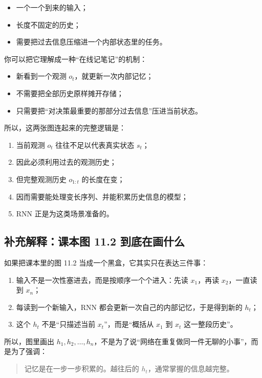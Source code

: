 \documentclass[12pt,a4paper]{ctexart}
\begin{document}
\begin{itemize}
  \item 一个一个到来的输入；
  \item 长度不固定的历史；
  \item 需要把过去信息压缩进一个内部状态里的任务。
\end{itemize}

你可以把它理解成一种“在线记笔记”的机制：
\begin{itemize}
  \item 新看到一个观测 \(o_t\)，就更新一次内部记忆；
  \item 不需要把全部历史原样摊开存储；
  \item 只需要把“对决策最重要的那部分过去信息”压进当前状态。
\end{itemize}

所以，这两张图连起来的完整逻辑是：
\begin{enumerate}
  \item 当前观测 \(o_t\) 往往不足以代表真实状态 \(s_t\)；
  \item 因此必须利用过去的观测历史；
  \item 但完整观测历史 \(o_{1:t}\) 的长度在变；
  \item 因而需要能处理变长序列、并能积累历史信息的模型；
  \item RNN 正是为这类场景准备的。
\end{enumerate}

\subsection{补充解释：课本图 11.2 到底在画什么}

如果把课本里的图 11.2 当成一个黑盒，它其实只在表达三件事：
\begin{enumerate}
  \item 输入不是一次性塞进去，而是按顺序一个个进入：先读 \(x_1\)，再读 \(x_2\)，一直读到 \(x_n\)；
  \item 每读到一个新输入，RNN 都会更新一次自己的内部记忆，于是得到新的 \(h_t\)；
  \item 这个 \(h_t\) 不是“只描述当前 \(x_t\)”，而是“概括从 \(x_1\) 到 \(x_t\) 这一整段历史”。
\end{enumerate}

所以，图里画出 \(h_1,h_2,\ldots,h_n\)，不是为了说“网络在重复做同一件无聊的小事”，而是为了强调：
\begin{quote}
记忆是在一步一步积累的。越往后的 \(h_t\)，通常掌握的信息越完整。
\end{quote}
\end{document}
